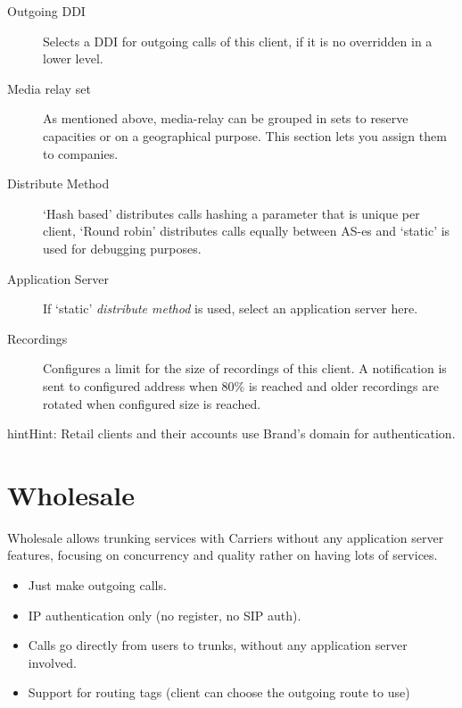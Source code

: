 \documentclass[letterpaper,10pt,english]{sphinxmanual}
\begin{document}
\begin{description}
\item[{Outgoing DDI}] \leavevmode{}\label{brand/retail:term-outgoing-ddi}
Selects a DDI for outgoing calls of this client, if it is no overridden in
a lower level.

\item[{Media relay set}] \leavevmode{}\label{brand/retail:term-media-relay-set}
As mentioned above, media-relay can be grouped in sets to reserve capacities
or on a geographical purpose. This section lets you assign them to companies.

\item[{Distribute Method}] \leavevmode{}\label{brand/retail:term-distribute-method}
`Hash based' distributes calls hashing a parameter that is unique per
client, `Round robin' distributes calls equally between AS-es and
`static' is used for debugging purposes.

\item[{Application Server}] \leavevmode{}\label{brand/retail:term-application-server}
If `static' \emph{distribute method} is used, select an application server here.

\item[{Recordings}] \leavevmode{}\label{brand/retail:term-recordings}
Configures a limit for the size of recordings of this client. A
notification is sent to configured address when 80\% is reached and
older recordings are rotated when configured size is reached.

\end{description}

\begin{notice}{hint}{Hint:}
Retail clients and their accounts use Brand's domain for authentication.
\end{notice}


\section{Wholesale}
\label{brand/wholesale:wholesale}\label{brand/wholesale:wholesale-clients}\label{brand/wholesale::doc}
Wholesale allows trunking services with Carriers without any application server features,
focusing on concurrency and quality rather on having lots of services.
\begin{itemize}
\item {} 
Just make outgoing calls.

\item {} 
IP authentication only (no register, no SIP auth).

\item {} 
Calls go directly from users to trunks, without any application server involved.

\item {} 
Support for routing tags (client can choose the outgoing route to use)

\end{itemize}
\end{document}
